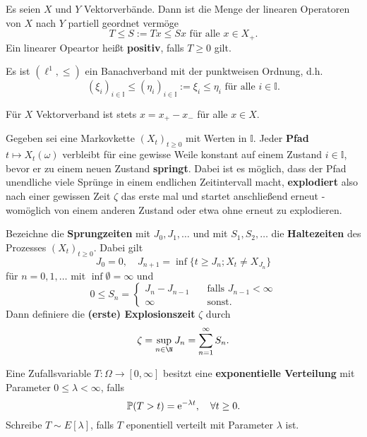 \begin{bsp}
Es seien $X$ und $Y$ Vektorverbände. Dann ist die Menge der linearen Operatoren von $X$ nach $Y$ partiell geordnet vermöge $$T\leq S:=Tx\leq Sx\text { für alle $x\in X_+$}.$$ Ein linearer Opeartor heißt \textbf{positiv}, falls $T\geq0$ gilt. 
\end{bsp}

\begin{bem}
Es ist $(\ell^1,\leq )$ ein Banachverband mit der  punktweisen Ordnung, d.h. $$(\xi_i)_{i\in\mathbb I}\leq (\eta_i)_{i\in\mathbb I}:= \xi_i\leq \eta_i\text{ für alle $i\in\mathbb I$}.$$
\end{bem}

\begin{bem}
Für $X$ Vektorverband ist stets $x=x_+ - x_-$ für alle $x\in X$.
\end{bem}



\begin{bem} Gegeben sei eine Markovkette $(X_t)_{t\geq0}$ mit Werten in $\mathbb I$. Jeder \textbf{Pfad} $t\mapsto X_t(\omega)$ verbleibt für eine gewisse Weile konstant auf einem Zustand $i\in\mathbb I$, bevor er zu einem neuen Zustand \textbf{springt}. Dabei ist es möglich, dass der Pfad unendliche viele Sprünge in einem endlichen Zeitintervall macht, \textbf{explodiert} also nach einer gewissen Zeit $\zeta$ das erste mal und startet anschließend erneut - womöglich von einem anderen Zustand oder etwa ohne erneut zu explodieren.
  
\par Bezeichne die \textbf{Sprungzeiten} mit $J_0,J_1,\dots$ und mit $S_1,S_2,\dots$ die \textbf{Haltezeiten} des Prozesses $(X_t)_{t\geq0}$. Dabei gilt $$J_0=0,\quad J_{n+1}=\inf\{t\geq J_n; X_t\neq X_{J_n}\}$$ für $n=0,1,\dots$ mit $\inf\emptyset = \infty$ und $$0\leq S_n=\begin{cases}J_n- J_{n-1}\quad&\text{falls } J_{n-1}< \infty\\\infty\quad&\text{sonst.}\end{cases}$$Dann definiere die \textbf{(erste) Explosionszeit} $\zeta$ durch $$\zeta = \sup_{n\in\N}J_n=\sum_{n=1}^\infty S_n.$$ 

\end{bem}

\begin{defi}
  Eine Zufallsvariable $T\colon\Omega\to[0,\infty]$ besitzt eine \textbf{exponentielle Verteilung} mit Parameter $0\leq \lambda <\infty$, falls $$\mathbb P(T>t)=\text e^{-\lambda t},\quad\forall t\geq0.$$ Schreibe $T\sim E[\lambda]$, falls $T$ eponentiell verteilt mit Parameter $\lambda$ ist. 
\end{defi}

